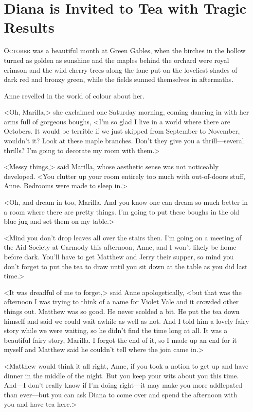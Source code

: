 \chapter{Diana is Invited to Tea with Tragic Results}

\lettrine{O}{ctober} was a beautiful month at Green Gables, when the birches in the hollow turned as golden as sunshine and the maples behind the orchard were royal crimson and the wild cherry trees along the lane put on the loveliest shades of dark red and bronzy green, while the fields sunned themselves in aftermaths.

Anne revelled in the world of colour about her.

<Oh, Marilla,> she exclaimed one Saturday morning, coming dancing in with her arms full of gorgeous boughs, <I'm so glad I live in a world where there are Octobers. It would be terrible if we just skipped from September to November, wouldn't it? Look at these maple branches. Don't they give you a thrill—several thrills? I'm going to decorate my room with them.>

<Messy things,> said Marilla, whose aesthetic sense was not noticeably developed. <You clutter up your room entirely too much with out-of-doors stuff, Anne. Bedrooms were made to sleep in.>

<Oh, and dream in too, Marilla. And you know one can dream so much better in a room where there are pretty things. I'm going to put these boughs in the old blue jug and set them on my table.>

<Mind you don't drop leaves all over the stairs then. I'm going on a meeting of the Aid Society at Carmody this afternoon, Anne, and I won't likely be home before dark. You'll have to get Matthew and Jerry their supper, so mind you don't forget to put the tea to draw until you sit down at the table as you did last time.>

<It was dreadful of me to forget,> said Anne apologetically, <but that was the afternoon I was trying to think of a name for Violet Vale and it crowded other things out. Matthew was so good. He never scolded a bit. He put the tea down himself and said we could wait awhile as well as not. And I told him a lovely fairy story while we were waiting, so he didn't find the time long at all. It was a beautiful fairy story, Marilla. I forgot the end of it, so I made up an end for it myself and Matthew said he couldn't tell where the join came in.>

<Matthew would think it all right, Anne, if you took a notion to get up and have dinner in the middle of the night. But you keep your wits about you this time. And—I don't really know if I'm doing right—it may make you more addlepated than ever—but you can ask Diana to come over and spend the afternoon with you and have tea here.>

